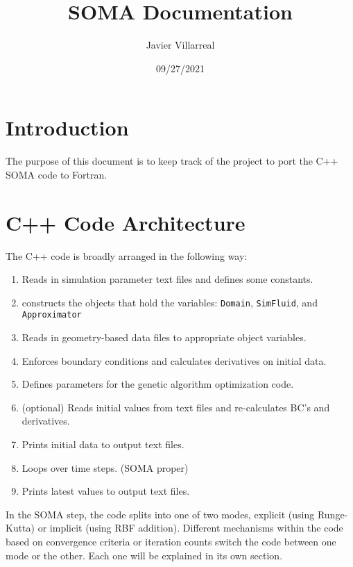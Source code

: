 \documentclass[12pt]{article}
\begin{document}
    \title{SOMA Documentation}
    \author{Javier Villarreal}
    \date{09/27/2021}
    \maketitle

    \section{Introduction}
        The purpose of this document is to keep track of the project to port the C++ SOMA code to Fortran.

    \section{C++ Code Architecture}
        The C++ code is broadly arranged in the following way:
        \begin{enumerate}
            \item Reads in simulation parameter text files and defines some constants.
            \item constructs the objects that hold the variables: \texttt{Domain}, \texttt{SimFluid}, and \texttt{Approximator}
            \item Reads in geometry-based data files to appropriate object variables.
            \item Enforces boundary conditions and calculates derivatives on initial data.
            \item Defines parameters for the genetic algorithm optimization code.
            \item (optional) Reads initial values from text files and re-calculates BC's and derivatives.
            \item Prints initial data to output text files.
            \item Loops over time steps. (SOMA proper)
            \item Prints latest values to output text files.
        \end{enumerate}
        In the SOMA step, the code splits into one of two modes, explicit (using Runge-Kutta) or implicit (using RBF addition). Different mechanisms within the code based on convergence criteria or iteration counts switch the code between one mode or the other. Each one will be explained in its own section.
    
\end{document}
